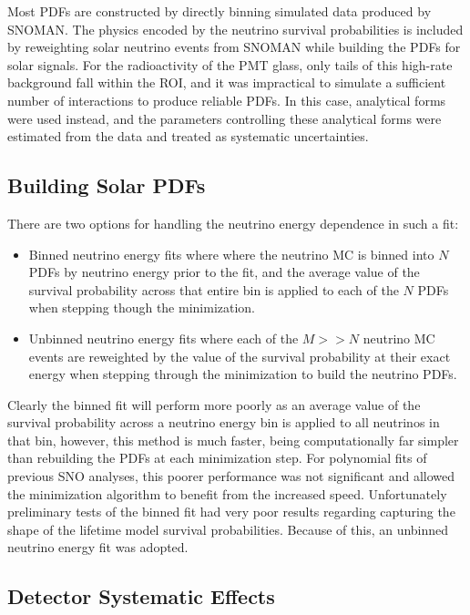 Most PDFs are constructed by directly binning simulated data produced by SNOMAN.
The physics encoded by the neutrino survival probabilities is included by reweighting solar neutrino events from SNOMAN while building the PDFs for solar signals.
For the radioactivity of the PMT glass, only tails of this high-rate background fall within the ROI, and it was impractical to simulate a sufficient number of interactions to produce reliable PDFs.
In this case, analytical forms were used instead, and the parameters controlling these analytical forms were estimated from the data and treated as systematic uncertainties.

\subsection{Building Solar PDFs}

There are two options for handling the neutrino energy dependence in such a fit:
\begin{itemize}
\item Binned neutrino energy fits where where the neutrino MC is binned into $N$ PDFs by neutrino energy prior to the fit, and the average value of the survival probability across that entire bin is applied to each of the $N$ PDFs when stepping though the minimization.
\item Unbinned neutrino energy fits where each of the $M >> N$ neutrino MC events are reweighted by the value of the survival probability at their exact energy when stepping through the minimization to build the neutrino PDFs.
\end{itemize}
Clearly the binned fit will perform more poorly as an average value of the survival probability across a neutrino energy bin is applied to all neutrinos in that bin, however, this method is much faster, being computationally far simpler than rebuilding the PDFs at each minimization step. 
For polynomial fits of previous SNO analyses, this poorer performance was not significant and allowed the minimization algorithm to benefit from the increased speed.
Unfortunately preliminary tests of the binned fit had very poor results regarding capturing the shape of the lifetime model survival probabilities.
Because of this, an unbinned neutrino energy fit was adopted.

\subsection{Detector Systematic Effects}
\label{systematics} 

